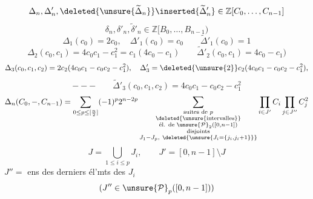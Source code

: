 \[
\Delta_n,\Delta'_n,\deleted{\unsure{\widetilde\Delta_n}}
\inserted{\widetilde\Delta'_n}\in\mathbb Z[C_0,\ldots,C_{n-1}]
\]
\[
\delta_n,\delta'_n,\widetilde\delta'_n\in\mathbb Z[B_0,\ldots,B_{n-1})
\]
\margin{\[
\begin{aligned}
\Delta'_n[C_0,\mathbin{-},C_{n-1}]
&=C_{n-1}\widetilde\Delta'_{n-1}(C_0,\mathbin{-},C_{n-2})\\
\delta'_n[B_0,\mathbin{-},B_{n-1}]
&=B_{n-1}\widetilde\delta'_n(B_0,\ldots,B_{n-2})
\end{aligned}
\]}
\[
\Delta_1(c_0)=2c_0,\quad\Delta'_1(c_0)=c_0
\qquad\widetilde\Delta'_1(c_0)=1
\]
\[
\Delta_2(c_0,c_1)=4c_0c_1-c_1^2=c_1(4c_0-c_1)
\qquad\widetilde\Delta'_2(c_0,c_1)=4c_0-c_1)
\]
\[
\Delta_3(c_0,c_1,c_2)=2c_2(4c_0c_1-c_0c_2-c_1^2),\quad
\Delta'_3=\deleted{\unsure{2}}c_2(4c_0c_1-c_0c_2-c_1^2),
\]
\[
\mathbin{---}\qquad
\widetilde\Delta'_3(c_0,c_1,c_2)=4c_0c_1-c_0c_2-c_1^2
\]
\[
\Delta_n(C_0,\mathbin{-},C_{n-1})
=\sum_{0\leq p\leq[\frac n2]}(-1)^p2^{n-2p}
\sum_{\substack{\text{suites de }p\\
\deleted{\unsure{\text{intervalles}}}\\
\text{él. de }\unsure{\mathcal P}_2([0,n-1])\\
\text{disjoints}\\
J_1\mathbin{-}J_p,\ \deleted{\unsure{J_i=\{j_i,j_i+1\}}}}}
\prod_{i\in J'}C_i\prod_{j\in J''}C_j^2
\]
\[
J=\bigcup_{1\leq i\leq p}J_i,\qquad
J'=[0,n-1]\setminus J
\]
$J''=$ ens des derniers él'mts des $J_i$
\[
(J''\in\unsure{\mathcal P}_p([0,n-1]))
\]

